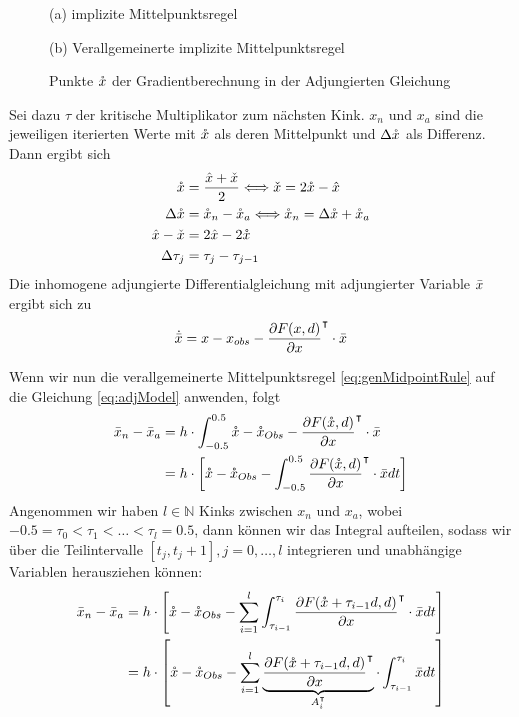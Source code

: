 \begin{figure}[H]
\footnotesize
\centering
\begin{minipage}[b]{\linewidth}

\caption*{(a) implizite Mittelpunktsregel}
\end{minipage}
\begin{minipage}[b]{\linewidth}

\caption*{(b) Verallgemeinerte implizite Mittelpunktsregel}
\end{minipage}
\caption{Punkte $\mathring{x}$ der Gradientberechnung in der Adjungierten Gleichung}
\label{fig:multipleKinksAdjoint}
\end{figure}


Sei dazu $\tau$ der kritische Multiplikator zum nächsten Kink. $x_n$ und $x_a$ sind die jeweiligen iterierten Werte mit $\mathring{x}$ als deren Mittelpunkt und $\Delta \mathring{x}$ als Differenz. Dann ergibt sich 
\begin{align*}
\mathring{x} &= \frac{\hat{x}+\check{x}}{2}\Longleftrightarrow \check{x} = 2\mathring{x} - \hat{x}\\
\Delta \mathring{x} &= \mathring{x}_n - \mathring{x}_a \Longleftrightarrow \mathring{x}_n = \Delta \mathring{x} + \mathring{x}_a\\
\hat{x} - \check{x} &= 2\hat{x} - 2\mathring{x}\\
\Delta \tau_j&=\tau_j-\tau_{j-1}
\end{align*}
Die inhomogene adjungierte Differentialgleichung mit adjungierter Variable $\bar{x}$ ergibt sich zu
\begin{equation}
\dot{\bar{x}} = x - x_{obs} - \frac{\partial F(x,d)}{\partial x}^\intercal \cdot \bar{x}
\label{eq:adjModel}
\end{equation}

Wenn wir nun die verallgemeinerte Mittelpunktsregel \eqref{eq:genMidpointRule} auf die Gleichung \eqref{eq:adjModel} anwenden, folgt
\begin{align*}
\bar{x}_n - \bar{x}_a &= h\cdot \int_{-0.5}^{0.5}\mathring{x}-\mathring{x}_{Obs} - \frac{\partial F(\mathring{x},d)}{\partial x}^\intercal \cdot \bar{x}\\
									&= h\cdot \left[\mathring{x}-\mathring{x}_{Obs} - \int_{-0.5}^{0.5} \frac{\partial F(\mathring{x} ,d)}{\partial x}^\intercal \cdot \bar{x} dt\right]\\
\end{align*}
Angenommen wir haben $l \in \mathbb{N}$ Kinks zwischen $x_n$ und $x_{a}$, wobei $-0.5 = \tau_0 <\tau_1 <\ldots < \tau_l=0.5$, dann können wir das Integral aufteilen, sodass wir über die Teilintervalle $[t_j,t_j+1], j=0,\ldots,l$ integrieren und unabhängige Variablen herausziehen können:
\begin{align*}
\bar{x}_n - \bar{x}_a &= h\cdot \left[ \mathring{x}-\mathring{x}_{Obs} - \sum_{i=1}^l \int_{\tau_{i-1}}^{\tau_{i}}\frac{\partial F(\mathring{x}+\tau_{i-1}d,d)}{\partial x}^\intercal \cdot \bar{x} dt\right]\\
									&= h\cdot \left[\mathring{x} -\mathring{x}_{Obs} - \sum_{i=1}^l \underbrace{\frac{\partial F(\mathring{x}+\tau_{i-1}d,d)}{\partial x}^\intercal }_{A_i^\intercal} \cdot \int_{\tau_{i-1}}^{\tau_{i}} \bar{x} dt\right]\\
\end{align*}


